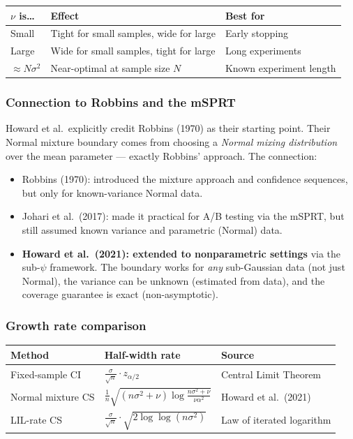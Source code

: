 \documentclass[12pt, a4paper]{article}
\begin{document}
\begin{center}
\begin{tabular}{@{} l l l @{}}
\toprule
$\nu$ is\ldots & \textbf{Effect} & \textbf{Best for} \\
\midrule
Small & Tight for small samples, wide for large & Early stopping \\
Large & Wide for small samples, tight for large & Long experiments \\
$\approx N\sigma^2$ & Near-optimal at sample size $N$ & Known experiment length \\
\bottomrule
\end{tabular}
\end{center}

\subsubsection*{Connection to Robbins and the mSPRT}

Howard et al.\ explicitly credit Robbins (1970) as their starting point.
Their Normal mixture boundary comes from choosing a \emph{Normal mixing
distribution} over the mean parameter --- exactly Robbins' approach.  The
connection:
\begin{itemize}[nosep]
  \item Robbins (1970): introduced the mixture approach and confidence
        sequences, but only for known-variance Normal data.
  \item Johari et al.\ (2017): made it practical for A/B testing via the
        mSPRT, but still assumed known variance and parametric (Normal) data.
  \item \textbf{Howard et al.\ (2021): extended to nonparametric settings}
        via the sub-$\psi$ framework.  The boundary works for \emph{any}
        sub-Gaussian data (not just Normal), the variance can be unknown
        (estimated from data), and the coverage guarantee is exact
        (non-asymptotic).
\end{itemize}

\subsubsection*{Growth rate comparison}

\begin{center}
\begin{tabular}{@{} l l l @{}}
\toprule
\textbf{Method} & \textbf{Half-width rate} & \textbf{Source} \\
\midrule
Fixed-sample CI & $\displaystyle\frac{\sigma}{\sqrt{n}} \cdot z_{\alpha/2}$
  & Central Limit Theorem \\
Normal mixture CS & $\displaystyle\frac{1}{n}\sqrt{(n\sigma^2 + \nu)
  \log\frac{n\sigma^2 + \nu}{\nu\alpha^2}}$ & Howard et al.\ (2021) \\
LIL-rate CS & $\displaystyle\frac{\sigma}{\sqrt{n}} \cdot
  \sqrt{2\log\log(n\sigma^2)}$ & Law of iterated logarithm \\
\bottomrule
\end{tabular}
\end{center}
\end{document}
